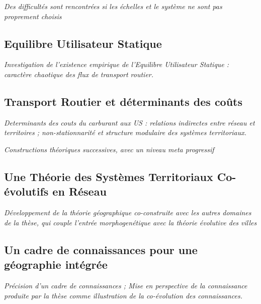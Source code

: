 \textit{Des difficultés sont rencontrées si les échelles et le système ne sont pas proprement choisis}

\subsection{Equilibre Utilisateur Statique}

\textit{Investigation de l'existence empirique de l'Equilibre Utilisateur Statique : caractère chaotique des flux de transport routier.}


\subsection{Transport Routier et déterminants des coûts}

\textit{Determinants des couts du carburant aux US : relations indirectes entre réseau et territoires ; non-stationnarité et structure modulaire des systèmes territoriaux.}








\textit{Constructions théoriques successives, avec un niveau meta progressif}

\subsection{Une Théorie des Systèmes Territoriaux Co-évolutifs en Réseau}

\textit{Développement de la théorie géographique co-construite avec les autres domaines de la thèse, qui couple l'entrée morphogenétique avec la théorie évolutive des villes}





\subsection{Un cadre de connaissances pour une géographie intégrée}

\textit{Précision d'un cadre de connaissances ; Mise en perspective de la connaissance produite par la thèse comme illustration de la co-évolution des connaissances.}



